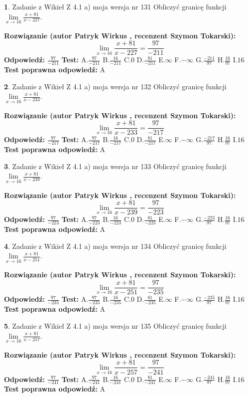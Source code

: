 \documentclass[12pt, a4paper]{article}
\theoremstyle{definition} %
\newtheorem{zad}{}
\newcommand{\zadStart}[1]{\begin{zad}#1\newline}
\newcommand{\zadStop}{\end{zad}}
\newcommand{\rozwStart}[2]{\noindent \textbf{Rozwiązanie (autor #1 , recenzent #2): }\newline}
\newcommand{\rozwStop}{\newline}
\newcommand{\odpStart}{\noindent \textbf{Odpowiedź:}\newline}
\newcommand{\odpStop}{\newline}
\newcommand{\testStart}{\noindent \textbf{Test:}\newline}
\newcommand{\testStop}{\newline}
\newcommand{\kluczStart}{\noindent \textbf{Test poprawna odpowiedź:}\newline}
\newcommand{\kluczStop}{\newline}
\begin{document}
\zadStart{Zadanie z Wikieł Z 4.1 a) moja wersja nr 131}
Obliczyć granicę funkcji $\lim\limits_{x\to16}\frac{x+81}{x-227}$.
\zadStop
\rozwStart{Patryk Wirkus}{Szymon Tokarski}
$$\lim\limits_{x\to16}\frac{x+81}{x-227} = \frac{97}{-211}$$
\rozwStop
\odpStart
$\frac{97}{-211}$
\odpStop
\testStart
A.$\frac{97}{-211}$
B.$\frac{16}{-211}$
C.$0$
D.$\frac{81}{-211}$
E.$\infty$
F.$-\infty$
G.$\frac{-211}{97}$
H.$\frac{16}{97}$
I.$16$
\testStop
\kluczStart
A
\kluczStop



\zadStart{Zadanie z Wikieł Z 4.1 a) moja wersja nr 132}
Obliczyć granicę funkcji $\lim\limits_{x\to16}\frac{x+81}{x-233}$.
\zadStop
\rozwStart{Patryk Wirkus}{Szymon Tokarski}
$$\lim\limits_{x\to16}\frac{x+81}{x-233} = \frac{97}{-217}$$
\rozwStop
\odpStart
$\frac{97}{-217}$
\odpStop
\testStart
A.$\frac{97}{-217}$
B.$\frac{16}{-217}$
C.$0$
D.$\frac{81}{-217}$
E.$\infty$
F.$-\infty$
G.$\frac{-217}{97}$
H.$\frac{16}{97}$
I.$16$
\testStop
\kluczStart
A
\kluczStop



\zadStart{Zadanie z Wikieł Z 4.1 a) moja wersja nr 133}
Obliczyć granicę funkcji $\lim\limits_{x\to16}\frac{x+81}{x-239}$.
\zadStop
\rozwStart{Patryk Wirkus}{Szymon Tokarski}
$$\lim\limits_{x\to16}\frac{x+81}{x-239} = \frac{97}{-223}$$
\rozwStop
\odpStart
$\frac{97}{-223}$
\odpStop
\testStart
A.$\frac{97}{-223}$
B.$\frac{16}{-223}$
C.$0$
D.$\frac{81}{-223}$
E.$\infty$
F.$-\infty$
G.$\frac{-223}{97}$
H.$\frac{16}{97}$
I.$16$
\testStop
\kluczStart
A
\kluczStop



\zadStart{Zadanie z Wikieł Z 4.1 a) moja wersja nr 134}
Obliczyć granicę funkcji $\lim\limits_{x\to16}\frac{x+81}{x-251}$.
\zadStop
\rozwStart{Patryk Wirkus}{Szymon Tokarski}
$$\lim\limits_{x\to16}\frac{x+81}{x-251} = \frac{97}{-235}$$
\rozwStop
\odpStart
$\frac{97}{-235}$
\odpStop
\testStart
A.$\frac{97}{-235}$
B.$\frac{16}{-235}$
C.$0$
D.$\frac{81}{-235}$
E.$\infty$
F.$-\infty$
G.$\frac{-235}{97}$
H.$\frac{16}{97}$
I.$16$
\testStop
\kluczStart
A
\kluczStop



\zadStart{Zadanie z Wikieł Z 4.1 a) moja wersja nr 135}
Obliczyć granicę funkcji $\lim\limits_{x\to16}\frac{x+81}{x-257}$.
\zadStop
\rozwStart{Patryk Wirkus}{Szymon Tokarski}
$$\lim\limits_{x\to16}\frac{x+81}{x-257} = \frac{97}{-241}$$
\rozwStop
\odpStart
$\frac{97}{-241}$
\odpStop
\testStart
A.$\frac{97}{-241}$
B.$\frac{16}{-241}$
C.$0$
D.$\frac{81}{-241}$
E.$\infty$
F.$-\infty$
G.$\frac{-241}{97}$
H.$\frac{16}{97}$
I.$16$
\testStop
\kluczStart
A
\kluczStop
\end{document}

